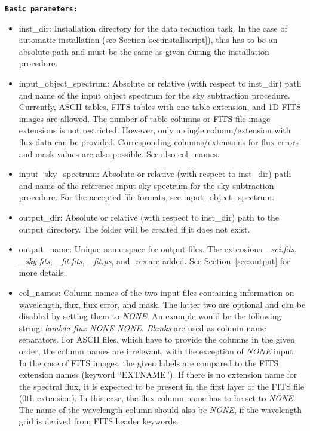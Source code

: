 {\bf\large\tt Basic parameters:}
\begin{itemize}
\item {\sc inst\_dir}: Installation directory for the data reduction task. In
the case of automatic installation (see Section\,\ref{sec:installscript}), this
has to be an absolute path and must be the same as given during the
installation procedure.
\item {\sc input\_object\_spectrum}: Absolute or relative (with respect to
{\sc inst\_dir}) path and name of the input object spectrum for the sky
subtraction procedure. Currently, \ac{ASCII} tables, \ac{FITS} tables with one
table extension, and 1D \ac{FITS} images are allowed. The number of table
columns or \ac{FITS} file image extensions is not restricted. However, only
a single column/extension with flux data can be provided. Corresponding
columns/extensions for flux errors and mask values are also possible. See also
{\sc col\_names}.
\item {\sc input\_sky\_spectrum}: Absolute or relative (with respect to
{\sc inst\_dir}) path and name of the reference input sky spectrum for the sky
subtraction procedure. For the accepted file formats, see
{\sc input\_object\_spectrum}.
\item {\sc output\_dir}: Absolute or relative (with respect to {\sc inst\_dir})
path to the output directory. The folder will be created if it does not exist.
\item {\sc output\_name}: Unique name space for output files. The extensions
{\it \_sci.fits}, {\it \_sky.fits}, {\it \_fit.fits}, {\it \_fit.ps}, and
{\it .res} are added. See Section~\ref{sec:output} for more details.
\item {\sc col\_names}: Column names of the two input files containing
information on wavelength, flux, flux error, and mask. The latter two are
optional and can be disabled by setting them to {\it NONE}. An example
would be the following string: {\it lambda flux NONE NONE}. {\it Blanks} are
used as column name separators. For \ac{ASCII} files, which have to provide the
columns in the given order, the column names are irrelevant, with the exception
of {\it NONE} input. In the case of \ac{FITS} images, the given labels are
compared to the \ac{FITS} extension names (keyword ``EXTNAME''). If there is no
extension name for the spectral flux, it is expected to be present in the first
layer of the \ac{FITS} file (0th extension). In this case, the flux column name
has to be set to {\it NONE}. The name of the wavelength column should also be
{\it NONE}, if the wavelength grid is derived from \ac{FITS} header keywords.

\end{itemize}
